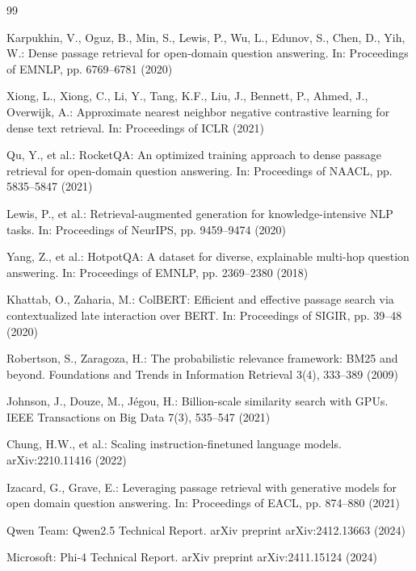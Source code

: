 \documentclass{llncs}
\begin{document}
\begin{thebibliography}{99}

Karpukhin, V., Oguz, B., Min, S., Lewis, P., Wu, L., Edunov, S., Chen, D.,
Yih, W.: Dense passage retrieval for open-domain question answering.
In: Proceedings of EMNLP, pp. 6769--6781 (2020)

Xiong, L., Xiong, C., Li, Y., Tang, K.F., Liu, J., Bennett, P., Ahmed, J.,
Overwijk, A.: Approximate nearest neighbor negative contrastive learning
for dense text retrieval. In: Proceedings of ICLR (2021)

Qu, Y., et al.: RocketQA: An optimized training approach to dense passage
retrieval for open-domain question answering.
In: Proceedings of NAACL, pp. 5835--5847 (2021)

Lewis, P., et al.: Retrieval-augmented generation for knowledge-intensive
NLP tasks. In: Proceedings of NeurIPS, pp. 9459--9474 (2020)

Yang, Z., et al.: HotpotQA: A dataset for diverse, explainable multi-hop
question answering. In: Proceedings of EMNLP, pp. 2369--2380 (2018)

Khattab, O., Zaharia, M.: ColBERT: Efficient and effective passage search
via contextualized late interaction over BERT.
In: Proceedings of SIGIR, pp. 39--48 (2020)

Robertson, S., Zaragoza, H.: The probabilistic relevance framework: BM25
and beyond. Foundations and Trends in Information Retrieval 3(4),
333--389 (2009)

Johnson, J., Douze, M., J{\'e}gou, H.: Billion-scale similarity search
with GPUs. IEEE Transactions on Big Data 7(3), 535--547 (2021)

Chung, H.W., et al.: Scaling instruction-finetuned language models.
arXiv:2210.11416 (2022)

Izacard, G., Grave, E.: Leveraging passage retrieval with generative
models for open domain question answering.
In: Proceedings of EACL, pp. 874--880 (2021)

Qwen Team: Qwen2.5 Technical Report. arXiv preprint arXiv:2412.13663 (2024)

Microsoft: Phi-4 Technical Report. arXiv preprint arXiv:2411.15124 (2024)

\end{thebibliography}
\end{document}
